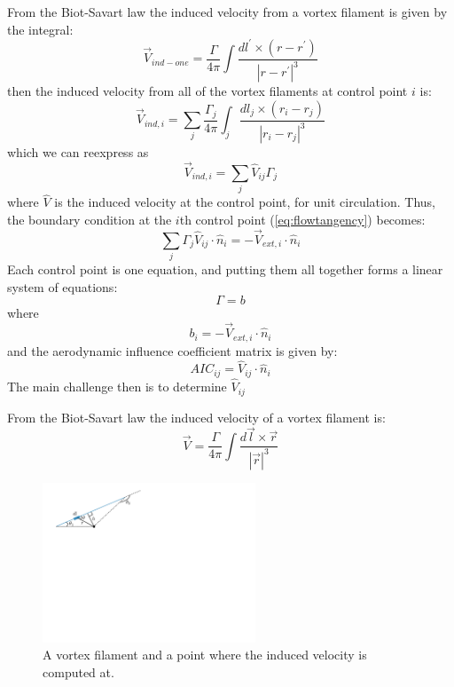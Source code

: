 \documentclass{article}
\begin{document}
From the Biot-Savart law the induced velocity from a vortex filament is given by the integral:
\begin{equation}
    \vec{V}_{ind-one} = \frac{\Gamma}{4\pi}\int \frac{dl^\prime \times (r - r^\prime)}{|r - r^\prime|^3}
\end{equation}
then the induced velocity from all of the vortex filaments at control point $i$ is:
\begin{equation}
    \vec{V}_{ind, i} = \sum_j \frac{\Gamma_j}{4\pi}\int_j \frac{dl_j \times (r_i - r_j)}{|r_i - r_j|^3}
\end{equation}
which we can reexpress as
\begin{equation}
    \vec{V}_{ind, i} = \sum_j \hat{V}_{ij} \Gamma_j
\end{equation}
where $\hat{V}$ is the induced velocity at the control point, for unit circulation.  Thus, the boundary condition at the $i$th control point (\cref{eq:flowtangency}) becomes:
\begin{equation}
\sum_j \Gamma_j \hat{V}_{ij} \cdot \hat{n}_{i} = - \vec V_{ext,i} \cdot \hat{n}_{i}
\end{equation}
Each control point is one equation, and putting them all together forms a linear system of equations:
\begin{equation}
[AIC] \Gamma = b 
\label{eq:linearsystem}
\end{equation}
where 
\begin{equation}
b_i = - \vec V_{ext, i} \cdot \hat{n}_{i}
\label{eq:rhs}
\end{equation}
and the aerodynamic influence coefficient matrix is given by:
\begin{equation}
AIC_{ij} = \hat{V}_{ij} \cdot \hat{n}_{i}
\end{equation}
The main challenge then is to determine $\hat{V}_{ij}$


From the Biot-Savart law the induced velocity of a vortex filament is:
\begin{equation}
\vec{V} = \frac{\Gamma}{4 \pi} \int \frac{d \vec{l} \times \vec{r}}{|\vec{r}|^3}
\label{eq:biotsavart}
\end{equation}

\begin{figure}[htbp]
\centering
\includegraphics[width=2.5in]{figs/filament}
\caption{A vortex filament and a point where the induced velocity is computed at.}
\label{fig:filament}
\end{figure}
\end{document}
